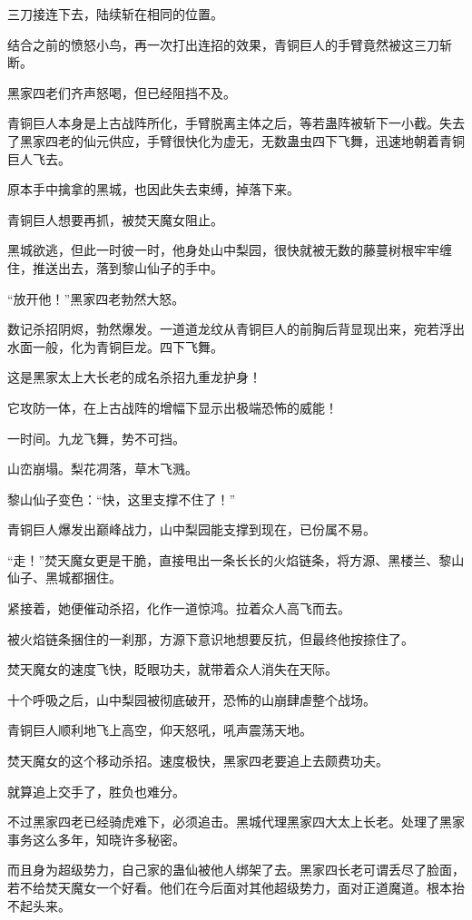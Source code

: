 \begin{this_body}
三刀接连下去，陆续斩在相同的位置。

结合之前的愤怒小鸟，再一次打出连招的效果，青铜巨人的手臂竟然被这三刀斩断。

黑家四老们齐声怒喝，但已经阻挡不及。

青铜巨人本身是上古战阵所化，手臂脱离主体之后，等若蛊阵被斩下一小截。失去了黑家四老的仙元供应，手臂很快化为虚无，无数蛊虫四下飞舞，迅速地朝着青铜巨人飞去。

原本手中擒拿的黑城，也因此失去束缚，掉落下来。

青铜巨人想要再抓，被焚天魔女阻止。

黑城欲逃，但此一时彼一时，他身处山中梨园，很快就被无数的藤蔓树根牢牢缠住，推送出去，落到黎山仙子的手中。

“放开他！”黑家四老勃然大怒。

数记杀招阴烬，勃然爆发。一道道龙纹从青铜巨人的前胸后背显现出来，宛若浮出水面一般，化为青铜巨龙。四下飞舞。

这是黑家太上大长老的成名杀招九重龙护身！

它攻防一体，在上古战阵的增幅下显示出极端恐怖的威能！

一时间。九龙飞舞，势不可挡。

山峦崩塌。梨花凋落，草木飞溅。

黎山仙子变色：“快，这里支撑不住了！”

青铜巨人爆发出巅峰战力，山中梨园能支撑到现在，已份属不易。

“走！”焚天魔女更是干脆，直接甩出一条长长的火焰链条，将方源、黑楼兰、黎山仙子、黑城都捆住。

紧接着，她便催动杀招，化作一道惊鸿。拉着众人高飞而去。

被火焰链条捆住的一刹那，方源下意识地想要反抗，但最终他按捺住了。

焚天魔女的速度飞快，眨眼功夫，就带着众人消失在天际。

十个呼吸之后，山中梨园被彻底破开，恐怖的山崩肆虐整个战场。

青铜巨人顺利地飞上高空，仰天怒吼，吼声震荡天地。

焚天魔女的这个移动杀招。速度极快，黑家四老要追上去颇费功夫。

就算追上交手了，胜负也难分。

不过黑家四老已经骑虎难下，必须追击。黑城代理黑家四大太上长老。处理了黑家事务这么多年，知晓许多秘密。

而且身为超级势力，自己家的蛊仙被他人绑架了去。黑家四长老可谓丢尽了脸面，若不给焚天魔女一个好看。他们在今后面对其他超级势力，面对正道魔道。根本抬不起头来。


\end{this_body}
